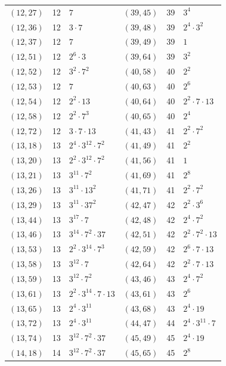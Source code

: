 \documentclass[11pt]{article}
\begin{document}
\begin{longtable}{@{}lrl@{\qquad}lrl@{}}
$(12,27)$ & 12 & $7$ & $(39,45)$ & 39 & $3^{4}$\\
$(12,36)$ & 12 & $3\cdot 7$ & $(39,48)$ & 39 & $2^{4}\cdot 3^{2}$\\
$(12,37)$ & 12 & $7$ & $(39,49)$ & 39 & $1$\\
$(12,51)$ & 12 & $2^{6}\cdot 3$ & $(39,64)$ & 39 & $3^{2}$\\
$(12,52)$ & 12 & $3^{2}\cdot 7^{2}$ & $(40,58)$ & 40 & $2^{2}$\\
$(12,53)$ & 12 & $7$ & $(40,63)$ & 40 & $2^{6}$\\
$(12,54)$ & 12 & $2^{2}\cdot 13$ & $(40,64)$ & 40 & $2^{2}\cdot 7\cdot 13$\\
$(12,58)$ & 12 & $2^{2}\cdot 7^{3}$ & $(40,65)$ & 40 & $2^{4}$\\
$(12,72)$ & 12 & $3\cdot 7\cdot 13$ & $(41,43)$ & 41 & $2^{2}\cdot 7^{2}$\\
$(13,18)$ & 13 & $2^{4}\cdot 3^{12}\cdot 7^{2}$ & $(41,49)$ & 41 & $2^{2}$\\
$(13,20)$ & 13 & $2^{2}\cdot 3^{12}\cdot 7^{2}$ & $(41,56)$ & 41 & $1$\\
$(13,21)$ & 13 & $3^{11}\cdot 7^{2}$ & $(41,69)$ & 41 & $2^{8}$\\
$(13,26)$ & 13 & $3^{11}\cdot 13^{2}$ & $(41,71)$ & 41 & $2^{2}\cdot 7^{2}$\\
$(13,29)$ & 13 & $3^{11}\cdot 37^{2}$ & $(42,47)$ & 42 & $2^{2}\cdot 3^{6}$\\
$(13,44)$ & 13 & $3^{17}\cdot 7$ & $(42,48)$ & 42 & $2^{4}\cdot 7^{2}$\\
$(13,46)$ & 13 & $3^{14}\cdot 7^{2}\cdot 37$ & $(42,51)$ & 42 & $2^{2}\cdot 7^{2}\cdot 13$\\
$(13,53)$ & 13 & $2^{2}\cdot 3^{14}\cdot 7^{3}$ & $(42,59)$ & 42 & $2^{6}\cdot 7\cdot 13$\\
$(13,58)$ & 13 & $3^{12}\cdot 7$ & $(42,64)$ & 42 & $2^{2}\cdot 7\cdot 13$\\
$(13,59)$ & 13 & $3^{12}\cdot 7^{2}$ & $(43,46)$ & 43 & $2^{4}\cdot 7^{2}$\\
$(13,61)$ & 13 & $2^{2}\cdot 3^{14}\cdot 7\cdot 13$ & $(43,61)$ & 43 & $2^{6}$\\
$(13,65)$ & 13 & $2^{4}\cdot 3^{11}$ & $(43,68)$ & 43 & $2^{4}\cdot 19$\\
$(13,72)$ & 13 & $2^{4}\cdot 3^{11}$ & $(44,47)$ & 44 & $2^{4}\cdot 3^{11}\cdot 7$\\
$(13,74)$ & 13 & $3^{12}\cdot 7^{2}\cdot 37$ & $(45,49)$ & 45 & $2^{4}\cdot 19$\\
$(14,18)$ & 14 & $3^{12}\cdot 7^{2}\cdot 37$ & $(45,65)$ & 45 & $2^{8}$\\

\end{longtable}
\end{document}
